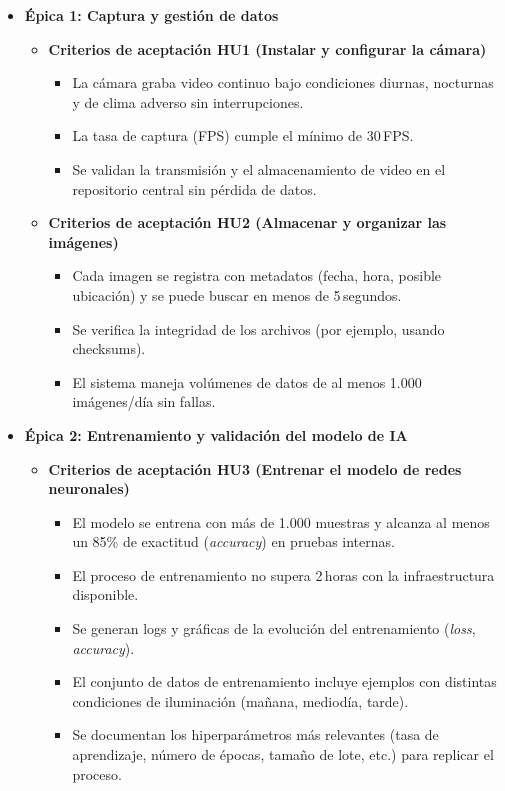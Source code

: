 \documentclass[
11pt, %
]{ProyectoVpC}
\begin{document}
\begin{itemize}
  \item \textbf{\'{E}pica 1: Captura y gestión de datos}
    \begin{itemize}
      \item \textbf{Criterios de aceptación HU1 (Instalar y configurar la cámara)}
        \begin{itemize}
          \item La cámara graba video continuo bajo condiciones diurnas, nocturnas y de clima adverso sin interrupciones.
          \item La tasa de captura (FPS) cumple el mínimo de 30\,FPS.
          \item Se validan la transmisión y el almacenamiento de video en el repositorio central sin pérdida de datos.
        \end{itemize}

      \item \textbf{Criterios de aceptación HU2 (Almacenar y organizar las imágenes)}
        \begin{itemize}
          \item Cada imagen se registra con metadatos (fecha, hora, posible ubicación) y se puede buscar en menos de 5\,segundos.
          \item Se verifica la integridad de los archivos (por ejemplo, usando checksums).
          \item El sistema maneja volúmenes de datos de al menos 1.000 imágenes/día sin fallas.
        \end{itemize}
    \end{itemize}

  \item \textbf{\'{E}pica 2: Entrenamiento y validación del modelo de IA}
    \begin{itemize}
      \item \textbf{Criterios de aceptación HU3 (Entrenar el modelo de redes neuronales)}
        \begin{itemize}
          \item El modelo se entrena con más de 1.000 muestras y alcanza al menos un 85\% de exactitud (\emph{accuracy}) en pruebas internas.
          \item El proceso de entrenamiento no supera 2\,horas con la infraestructura disponible.
          \item Se generan logs y gráficas de la evolución del entrenamiento (\emph{loss}, \emph{accuracy}).
          \item El conjunto de datos de entrenamiento incluye ejemplos con distintas condiciones de iluminación (mañana, mediodía, tarde).
          \item Se documentan los hiperparámetros más relevantes (tasa de aprendizaje, número de épocas, tamaño de lote, etc.) para replicar el proceso.
        \end{itemize}


\end{itemize}
\end{itemize}
\end{document}
